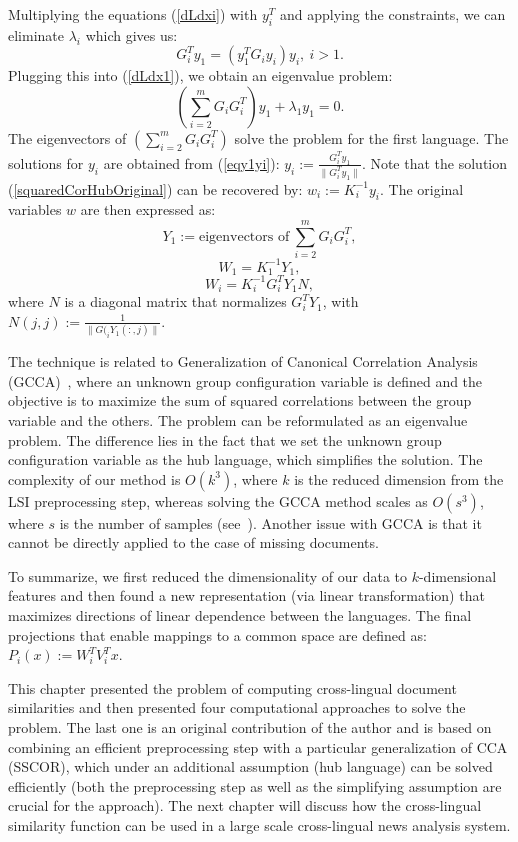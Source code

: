 Multiplying the equations (\ref{dLdxi}) with $y_i^T$ and applying the
constraints, we can eliminate $\lambda_i$ which gives us:
\begin{equation}\label{eqy1yi}
G_{i}^T y_1 = \left(y_1^T G_{i} y_i \right) y_i,~i > 1.
\end{equation}
Plugging this into (\ref{dLdx1}), we obtain an eigenvalue problem:
$$\left( \sum_{i = 2}^m G_i G_{i}^T \right) y_1 + \lambda_1 y_1 = 0.$$
The eigenvectors of $\left( \sum_{i = 2}^m G_i G_{i}^T \right)$ solve
the problem for the first language. The solutions for $y_i$ are obtained
from (\ref{eqy1yi}): $y_i := \frac{G_{i}^T y_1}{\| G_{i}^T y_1 \|}$.
Note that the solution (\ref{squaredCorHubOriginal}) can be recovered
by: $w_i := K_i^{-1} y_i$. The original variables $w$
are then expressed as:
$$ Y_1 := \text{eigenvectors of}~\sum_{i = 2}^m G_i G_{i}^T, $$
$$ W_1 = K_1^{-1} Y_1,$$
$$ W_i = K_i^{-1} G_{i}^T Y_1 N,$$
where $N$ is a diagonal matrix that normalizes $G_{i}^T Y_1$, with
$N(j,j) := \frac{1}{\|G(_{i} Y_1(:,j)\|}$.

 The technique is related to  Generalization of Canonical
Correlation Analysis (GCCA)~\cite{Carroll}, where an unknown
group configuration variable is defined and the objective is to maximize the
sum of squared correlations between the group variable and the others. The
problem can be reformulated as an eigenvalue problem. The difference lies in
the fact that we set the unknown group configuration variable as the hub language,
which simplifies the solution. The complexity of our method is $O(k^3)$, where $k$
is the reduced dimension from the LSI preprocessing step, whereas solving the
GCCA method scales as $O(s^3)$, where $s$ is the number of samples (see~\cite{gifi}).
Another issue with GCCA is that it cannot be directly applied to the case of missing documents.

To summarize, we first reduced the dimensionality of our data to $k$-dimensional
features and then found a new representation (via linear transformation) that
maximizes directions of linear dependence between the languages. The final
projections that enable mappings to a common space are defined as:
$P_i(x) := W_i^T V_i^T x.$


This chapter presented the problem of computing cross-lingual document similarities and then presented four computational
approaches to solve the problem. The last one is an original contribution of the author and is based on combining an efficient
preprocessing step with a particular generalization of CCA (SSCOR), which under an additional assumption (hub language) can
be solved efficiently (both the preprocessing step as well as the simplifying assumption are crucial for the approach). The
next chapter will discuss how the cross-lingual similarity function can be used in a large scale cross-lingual news analysis system.